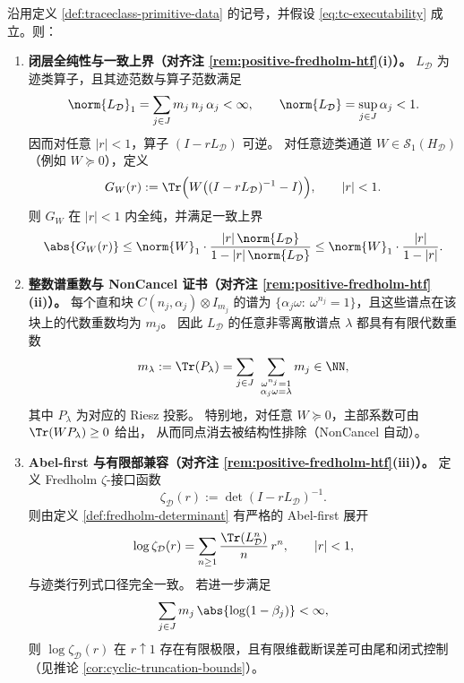 \begin{theorem}\label{thm:cyclic-fredholm-witt}
沿用定义 \ref{def:traceclass-primitive-data} 的记号，并假设 \eqref{eq:tc-executability} 成立。则：
\begin{enumerate}
  \item \textbf{闭层全纯性与一致上界（对齐注 \ref{rem:positive-fredholm-htf}(i)）。}
  \(L_{\mathcal D}\) 为迹类算子，且其迹范数与算子范数满足
  \[
  \norm{L_{\mathcal D}}_1=\sum_{j\in J} m_j\,n_j\,\alpha_j<\infty,
  \qquad
  \norm{L_{\mathcal D}}=\sup_{j\in J}\alpha_j<1.
  \]
  因而对任意 \(|r|<1\)，算子 \((I-rL_{\mathcal D})\) 可逆。
  对任意迹类通道 \(W\in\mathcal{S}_1(H_{\mathcal D})\)（例如 \(W\succeq 0\)），定义
  \[
  G_W(r):=\Tr\Bigl(W\bigl((I-rL_{\mathcal D})^{-1}-I\bigr)\Bigr),\qquad |r|<1.
  \]
  则 \(G_W\) 在 \(|r|<1\) 内全纯，并满足一致上界
  \[
  \abs{G_W(r)}
  \le
  \norm{W}_1\cdot\frac{|r|\,\norm{L_{\mathcal D}}}{1-|r|\,\norm{L_{\mathcal D}}}
  \le
  \norm{W}_1\cdot\frac{|r|}{1-|r|}.
  \]

  \item \textbf{整数谱重数与 NonCancel 证书（对齐注 \ref{rem:positive-fredholm-htf}(ii)）。}
  每个直和块 \(C(n_j,\alpha_j)\otimes I_{m_j}\) 的谱为
  \(
  \{\alpha_j\omega:\ \omega^{n_j}=1\}
  \)，且这些谱点在该块上的代数重数均为 \(m_j\)。
  因此 \(L_{\mathcal D}\) 的任意非零离散谱点 \(\lambda\) 都具有有限代数重数
  \[
  m_\lambda:=\Tr(P_\lambda)
  =
  \sum_{j\in J}\ \sum_{\substack{\omega^{n_j}=1\\ \alpha_j\omega=\lambda}} m_j
  \in\NN,
  \]
  其中 \(P_\lambda\) 为对应的 Riesz 投影。
  特别地，对任意 \(W\succeq 0\)，主部系数可由 \(\Tr(WP_\lambda)\ge 0\) 给出，
  从而同点消去被结构性排除（NonCancel 自动）。

  \item \textbf{Abel-first 与有限部兼容（对齐注 \ref{rem:positive-fredholm-htf}(iii)）。}
  定义 Fredholm \(\zeta\)-接口函数
  \[
  \zeta_{\mathcal D}(r):=\det(I-rL_{\mathcal D})^{-1}.
  \]
  则由定义 \ref{def:fredholm-determinant} 有严格的 Abel-first 展开
  \[
  \log \zeta_{\mathcal D}(r)=\sum_{n\ge 1}\frac{\Tr(L_{\mathcal D}^n)}{n}\,r^n,\qquad |r|<1,
  \]
  与迹类行列式口径完全一致。
  若进一步满足
  \begin{equation}\label{eq:fp-summability}
  \sum_{j\in J} m_j\,\abs{\log(1-\beta_j)}<\infty,
  \end{equation}
  则 \(\log \zeta_{\mathcal D}(r)\) 在 \(r\uparrow 1\) 存在有限极限，且有限维截断误差可由尾和闭式控制（见推论 \ref{cor:cyclic-truncation-bounds}）。
\end{enumerate}
\end{theorem}

